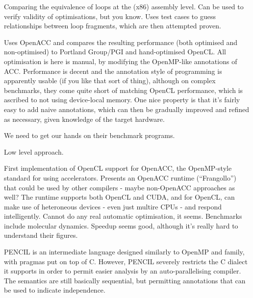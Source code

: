 \documentclass[a4paper, oneside, final]{memoir}
\begin{document}
\begin{quote}
\end{quote}

Comparing the equivalence of loops at the (x86) assembly level.  Can
be used to verify validity of optimisations, but you know.  Uses test
cases to guess relationships between loop fragments, which are then
attempted proven.

\begin{quote}
\end{quote}

Uses OpenACC and compares the resulting performance (both optimised
and non-optimised) to Portland Group/PGI and hand-optimised OpenCL.
All optimisation is here is manual, by modifying the OpenMP-like
annotations of ACC.  Performance is decent and the annotation style of
programming is apparently usable (if you like that sort of thing),
although on complex benchmarks, they come quite short of matching
OpenCL performance, which is ascribed to not using device-local
memory.  One nice property is that it's fairly easy to add naive
annotations, which can then be gradually improved and refined as
necessary, given knowledge of the target hardware.

We need to get our hands on their benchmark programs.

Low level approach.

\begin{quote}
\end{quote}

First implementation of OpenCL support for OpenACC, the OpenMP-style
standard for using accelerators.  Presents an OpenACC runtime
(``Frangollo'') that could be used by other compilers - maybe
non-OpenACC approaches as well?  The runtime supports both OpenCL and
CUDA, and for OpenCL, can make use of heteroneous devices - even just
multire CPUs - and respond intelligently.  Cannot do any real
automatic optimisation, it seems.  Benchmarks include molecular
dynamics.  Speedup seems good, although it's really hard to understand
their figures.

\begin{quote}
\end{quote}

PENCIL is an intermediate language designed similarly to OpenMP and
family, with pragmas put on top of C.  However, PENCIL severely
restricts the C dialect it supports in order to permit easier analysis
by an auto-parallelising compiler.  The semantics are still basically
sequential, but permitting annotations that can be used to indicate
independence.
\end{document}
